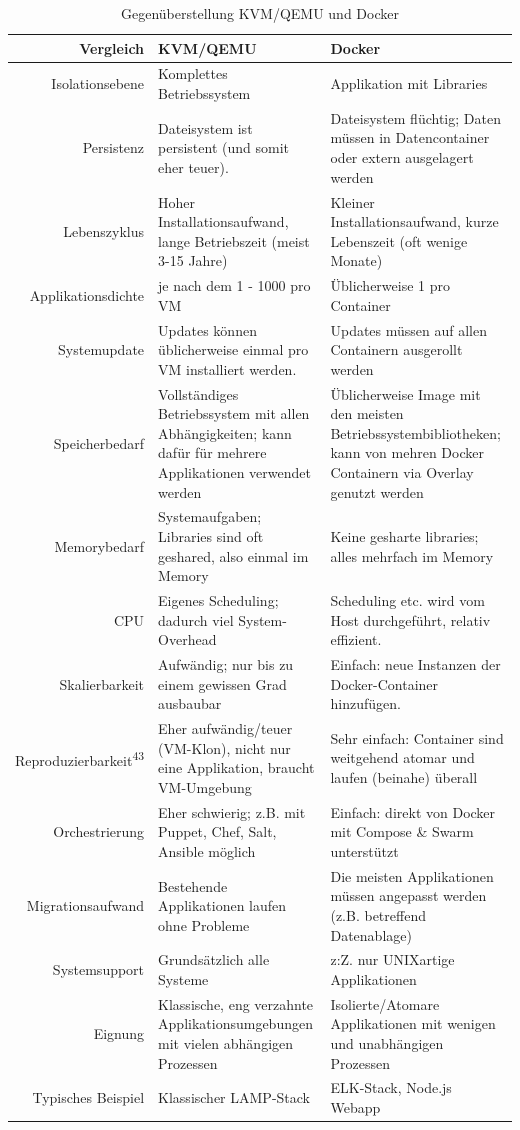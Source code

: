 \pagebreak
\begin{table}[H]
	\centering
	\begin{tabu} to \linewidth {r | X X}
		\toprule
		\textbf{Vergleich} & \textbf{KVM/QEMU} & \textbf{Docker} \\
		\midrule
		Isolationsebene & Komplettes Betriebssystem & Applikation mit Libraries \\ \hline
		Persistenz & Dateisystem ist persistent (und somit eher teuer). & Dateisystem flüchtig; Daten müssen in Datencontainer  oder extern ausgelagert werden \\ \hline
		Lebenszyklus & Hoher Installationsaufwand, lange Betriebszeit (meist 3-15 Jahre) & Kleiner Installationsaufwand, kurze Lebenszeit (oft wenige Monate) \\ \hline
		Applikationsdichte & je nach dem 1 - 1000 pro VM & Üblicherweise 1 pro Container \\ \hline
		Systemupdate & Updates können üblicherweise einmal pro VM installiert werden. & Updates müssen auf allen Containern ausgerollt werden \\ \hline
		Speicherbedarf & Vollständiges Betriebssystem mit allen Abhängigkeiten; kann dafür für mehrere Applikationen verwendet werden & Üblicherweise Image mit den meisten Betriebssystembibliotheken; kann von mehren Docker Containern via Overlay genutzt werden \\ \hline
		Memorybedarf & Systemaufgaben; Libraries sind oft geshared, also einmal im Memory & Keine gesharte libraries; alles mehrfach im Memory \\ \hline
		CPU & Eigenes Scheduling; dadurch viel System-Overhead & Scheduling etc. wird vom Host durchgeführt, relativ effizient. \\ \hline
		Skalierbarkeit & Aufwändig; nur bis zu einem gewissen Grad ausbaubar & Einfach: neue Instanzen der Docker-Container hinzufügen. \\ \hline
		Reproduzierbarkeit\textsuperscript{43} & Eher aufwändig/teuer (VM-Klon), nicht nur eine Applikation, braucht VM-Umgebung & Sehr einfach: Container sind weitgehend atomar und laufen (beinahe) überall\\ \hline
		Orchestrierung & Eher schwierig; z.B. mit Puppet, Chef, Salt, Ansible möglich & Einfach: direkt von Docker mit Compose \& Swarm unterstützt \\ \hline
		Migrationsaufwand & Bestehende Applikationen laufen ohne Probleme & Die meisten Applikationen müssen angepasst werden (z.B. betreffend Datenablage) \\ \hline
		Systemsupport & Grundsätzlich alle Systeme & z:Z. nur UNIXartige Applikationen \\ \hline
		Eignung & Klassische, eng verzahnte Applikationsumgebungen mit vielen abhängigen Prozessen & Isolierte/Atomare Applikationen mit wenigen und unabhängigen Prozessen \\ \hline
		Typisches Beispiel & Klassischer LAMP-Stack & ELK-Stack, Node.js Webapp \\
		\bottomrule
	\end{tabu}
	\caption{Gegenüberstellung KVM/QEMU und Docker}
	\label{tabu:kvm-docker}
\end{table}
